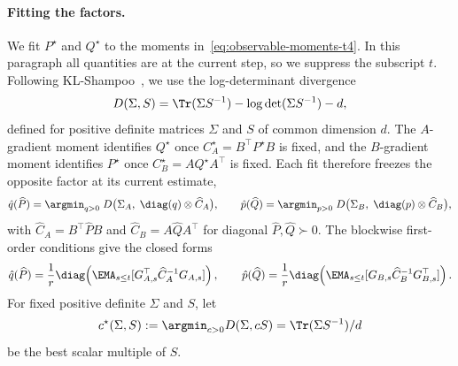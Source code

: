 \paragraph{Fitting the factors.} We fit $P^\star$ and $Q^\star$ to the
moments in~\eqref{eq:observable-moments-t4}. In this paragraph all
quantities are at the current step, so we suppress the subscript $t$.
Following KL-Shampoo~\cite{klshampoo}, we use the log-determinant
divergence~\cite{logdetdiv}
\[
  D(\Sigma,S)=\Tr(\Sigma S^{-1})-\log\det(\Sigma S^{-1})-d,
\]
defined for positive definite matrices $\Sigma$ and $S$ of common dimension
$d$. The $A$-gradient moment identifies $Q^\star$ once
$C^\star_A=B^\top P^\star B$ is fixed, and the $B$-gradient moment
identifies $P^\star$ once $C^\star_B=AQ^\star A^\top$ is fixed. Each fit
therefore freezes the opposite factor at its current estimate,
\begin{equation}\label{eq:factor-fit-t4}
  \hat{q}(\widehat P)
  =\argmin_{q>0}\;
  D\big(\Sigma_A,\; \diag(q) \otimes \widehat C_A\big),
  \qquad
  \hat{p}(\widehat Q)
  =\argmin_{p>0}\;
  D\big(\Sigma_B,\;\diag(p) \otimes \widehat C_B\big),
\end{equation}
with $\widehat C_A=B^\top\widehat PB$ and $\widehat C_B=A\widehat QA^\top$
for diagonal $\widehat P,\widehat Q\succ0$. The blockwise first-order
conditions give the closed forms
\[
  \hat{q}(\widehat P)=\frac1r\diag\!\left(\EMA_{s \leq t}[G_{A,s}^\top \widehat C_A^{-1}G_{A,s}]\right),
  \qquad
  \hat{p}(\widehat Q)=\frac1r\diag\!\left(\EMA_{s \leq t}[G_{B,s} \widehat C_B^{-1}G_{B,s}^\top]\right).
\]
For fixed positive definite $\Sigma$ and $S$, let
\[
  c^\star(\Sigma,S) :=\argmin_{c>0}D(\Sigma,cS)=\Tr(\Sigma S^{-1})/d
\]
be the best scalar multiple of $S$.

